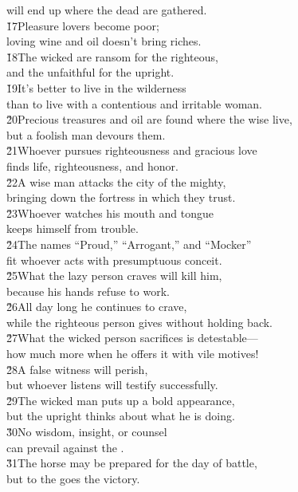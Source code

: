 \begin{poetry}
\poemll    will end up where the dead are gathered. \\
\poeml \v{17}Pleasure lovers become poor; \\
\poemll    loving wine and oil doesn't bring riches. \\
\poeml \v{18}The wicked are ransom for the righteous, \\
\poemll    and the unfaithful for the upright. \\
\poeml \v{19}It's better to live in the wilderness \\
\poemll    than to live with a contentious and irritable woman. \\
\poeml \v{20}Precious treasures and oil are found where the wise live, \\
\poemll    but a foolish man devours them. \\
\poeml \v{21}Whoever pursues righteousness and gracious love \\
\poemll    finds life, righteousness, and honor. \\
\poeml \v{22}A wise man attacks the city of the mighty, \\
\poemll    bringing down the fortress in which they trust. \\
\poeml \v{23}Whoever watches his mouth and tongue \\
\poemll    keeps himself from trouble. \\
\poeml \v{24}The names ``Proud,'' ``Arrogant,'' and ``Mocker'' \\
\poemll    fit whoever acts with presumptuous conceit. \\
\poeml \v{25}What the lazy person craves will kill him, \\
\poemll    because his hands refuse to work. \\
\poeml \v{26}All day long he continues to crave, \\
\poemll    while the righteous person gives without holding back. \\
\poeml \v{27}What the wicked person sacrifices is detestable--- \\
\poemll    how much more when he offers it with vile motives! \\
\poeml \v{28}A false witness will perish, \\
\poemll    but whoever listens will testify successfully. \\
\poeml \v{29}The wicked man puts up a bold appearance, \\
\poemll    but the upright thinks about what he is doing. \\
\poeml \v{30}No wisdom, insight, or counsel \\
\poemll    can prevail against the . \\
\poeml \v{31}The horse may be prepared for the day of battle, \\
\poemll    but to the  goes the victory.
\end{poetry}

